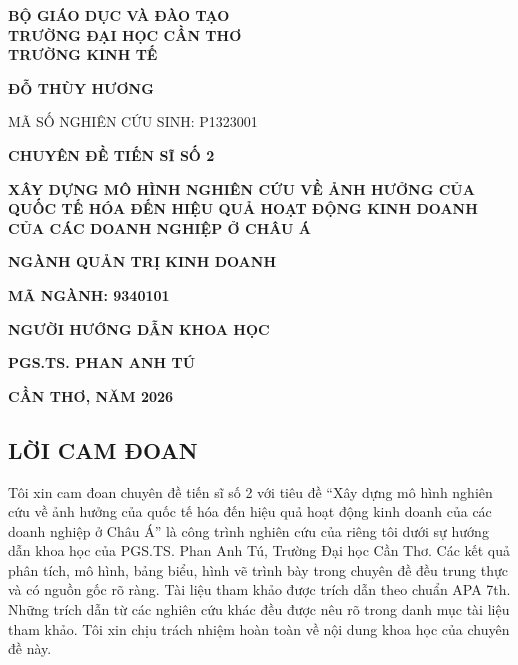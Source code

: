 \documentclass[
  a4paper,
  13pt]{extreport}
\author{}
\date{}
\begin{document}
\thispagestyle{empty}
\begin{center}
{\fontsize{14}{18}\selectfont\bfseries BỘ GIÁO DỤC VÀ ĐÀO TẠO\\TRƯỜNG ĐẠI HỌC CẦN THƠ\\TRƯỜNG KINH TẾ}

\vspace{1.8cm}
{\fontsize{14}{18}\selectfont\bfseries ĐỖ THÙY HƯƠNG}

{\fontsize{13}{17}\selectfont MÃ SỐ NGHIÊN CỨU SINH: P1323001}

\vspace{1.6cm}
{\fontsize{14}{18}\selectfont\bfseries CHUYÊN ĐỀ TIẾN SĨ SỐ 2}

\vspace{0.7cm}
{\fontsize{17}{23}\selectfont\bfseries XÂY DỰNG MÔ HÌNH NGHIÊN CỨU VỀ ẢNH HƯỞNG CỦA QUỐC TẾ HÓA ĐẾN HIỆU QUẢ HOẠT ĐỘNG KINH DOANH CỦA CÁC DOANH NGHIỆP Ở CHÂU Á}

\vspace{1.5cm}
{\fontsize{14}{18}\selectfont\bfseries NGÀNH QUẢN TRỊ KINH DOANH}

{\fontsize{14}{18}\selectfont\bfseries MÃ NGÀNH: 9340101}

\vspace{1.1cm}
{\fontsize{13}{17}\selectfont\bfseries NGƯỜI HƯỚNG DẪN KHOA HỌC}

{\fontsize{13}{17}\selectfont\bfseries PGS.TS. PHAN ANH TÚ}

\vspace{1.3cm}
{\fontsize{14}{18}\selectfont\bfseries CẦN THƠ, NĂM 2026}
\end{center}
\newpage

\hypertarget{lux1eddi-cam-ux111oan}{%
\subsection{LỜI CAM ĐOAN}\label{lux1eddi-cam-ux111oan}}

Tôi xin cam đoan chuyên đề tiến sĩ số 2 với tiêu đề ``Xây dựng mô hình
nghiên cứu về ảnh hưởng của quốc tế hóa đến hiệu quả hoạt động kinh
doanh của các doanh nghiệp ở Châu Á'' là công trình nghiên cứu của riêng
tôi dưới sự hướng dẫn khoa học của PGS.TS. Phan Anh Tú, Trường Đại học
Cần Thơ. Các kết quả phân tích, mô hình, bảng biểu, hình vẽ trình bày
trong chuyên đề đều trung thực và có nguồn gốc rõ ràng. Tài liệu tham
khảo được trích dẫn theo chuẩn APA 7th. Những trích dẫn từ các nghiên
cứu khác đều được nêu rõ trong danh mục tài liệu tham khảo. Tôi xin chịu
trách nhiệm hoàn toàn về nội dung khoa học của chuyên đề này.
\end{document}
